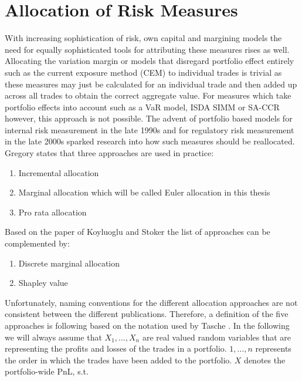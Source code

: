\documentclass[../Thesis_AHoecherl.tex]{subfiles}
\begin{document}
\section{Allocation of Risk Measures}\label{Allocation of Risk Measures}

With increasing sophistication of risk, own capital and margining models the need for equally sophisticated tools for attributing these measures rises as well. Allocating the variation margin or models that disregard portfolio effect entirely such as the current exposure method (CEM) to individual trades is trivial as these measures may just be calculated for an individual trade and then added up across all trades to obtain the correct aggregate value. 
For measures which take portfolio effects into account such as a \gls{VaR} model, \gls{ISDA SIMM} or \gls{SA-CCR} however, this approach is not possible. The advent of portfolio based models for internal risk measurement in the late 1990s and for regulatory risk measurement in the late 2000s sparked research into how such measures should be reallocated. Gregory \cite[Chapter~10.7]{gregory2015xva} states that three approaches are used in practice: 
\begin{enumerate}
\item Incremental allocation
\item Marginal allocation which will be called Euler allocation in this thesis  
\item Pro rata allocation
\end{enumerate}

Based on the paper of Koyluoglu and Stoker \cite{koyluoglu2002risk} the list of approaches can be complemented by:
\begin{enumerate}[resume]
    \item Discrete marginal allocation
    \item Shapley value
\end{enumerate}
 
Unfortunately, naming conventions for the different allocation approaches are not consistent between the different publications.
Therefore, a definition of the five approaches is following based on the notation used by Tasche \cite{tasche2007}. In the following we will always assume that $X_1, \dots, X_n$ are real valued random variables that are representing the profits and losses of the trades in a portfolio. $1, \dots, n$ represents the order in which the trades have been added to the portfolio. $X$ denotes the portfolio-wide \gls{PnL}, s.t.
\end{document}
